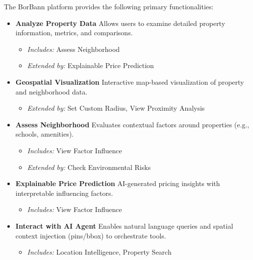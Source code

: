 The BorBann platform provides the following primary functionalities:

\begin{itemize}
	\item \textbf{Analyze Property Data}  
	      Allows users to examine detailed property information, metrics, and comparisons.  
	      \begin{itemize}
	      	\item \textit{Includes:} Assess Neighborhood
	      	\item \textit{Extended by:} Explainable Price Prediction
	      \end{itemize}
	      
	\item \textbf{Geospatial Visualization}  
	      Interactive map-based visualization of property and neighborhood data.  
	      \begin{itemize}
	      	\item \textit{Extended by:} Set Custom Radius, View Proximity Analysis
	      \end{itemize}
	      
	\item \textbf{Assess Neighborhood}  
	      Evaluates contextual factors around properties (e.g., schools, amenities).  
	      \begin{itemize}
	      	\item \textit{Includes:} View Factor Influence
	      	\item \textit{Extended by:} Check Environmental Risks
	      \end{itemize}
	      
	\item \textbf{Explainable Price Prediction}  
	      AI-generated pricing insights with interpretable influencing factors.  
	      \begin{itemize}
	      	\item \textit{Includes:} View Factor Influence
	      \end{itemize}
	      
	\item \textbf{Interact with AI Agent}  
	      Enables natural language queries and spatial context injection (pins/bbox) to orchestrate tools.  
	      \begin{itemize}
	      	\item \textit{Includes:} Location Intelligence, Property Search
	      \end{itemize}
\end{itemize}

